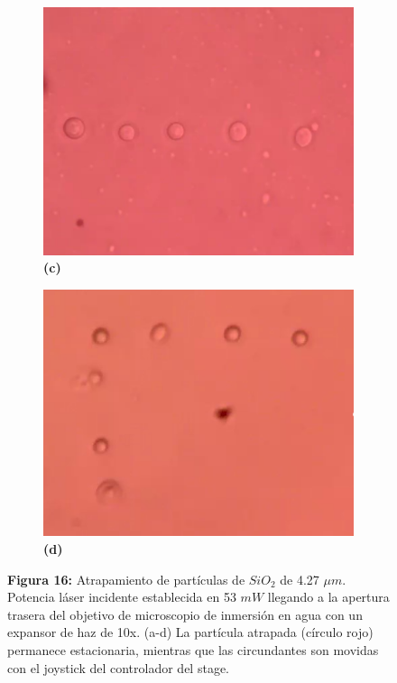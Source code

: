 \documentclass[10pt,aspectratio=1610,compress,dvipsnames]{beamer}
\begin{document}
\begin{frame}
{\begin{figure}
  \begin{subfigure}[b]{0.2\linewidth}
    \includegraphics[width=\linewidth]{particlesnow.png} %
    \caption*{\textbf{(c)}}
    \label{fig7:c}
  \end{subfigure}\hspace{0.5cm} %
  \begin{subfigure}[b]{0.2\linewidth}
    \includegraphics[width=\linewidth]{Particles3.png} %
    \caption*{\textbf{(d)}}
    \label{fig7:d}
  \end{subfigure}
  \captionsetup{labelformat = empty}
  \caption{\textbf{Figura 16: }
Atrapamiento de partículas de $SiO_2$ de 4.27 $\mu m$. Potencia láser incidente establecida en 53 $mW$ llegando a la apertura trasera del objetivo de microscopio de inmersión en agua con un expansor de haz de 10x. (a-d) La partícula atrapada (círculo rojo) permanece estacionaria, mientras que las circundantes son movidas con el joystick del controlador del stage.}
  \label{poresfrustrules}
\end{figure}


}
\end{frame}
\end{document}
